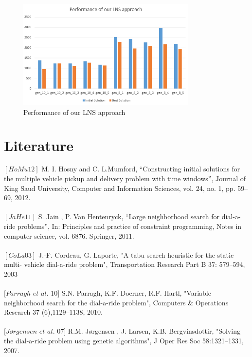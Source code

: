 \documentclass[fleqn]{scrartcl}
\begin{document}
\begin{figure}[H] 
\centering
\includegraphics[width=0.8\textwidth]{files/performance_lns.png}
\caption{Performance of our LNS approach}
\label{fig:performance}
\end{figure}

\newpage
\section{Literature}
$[HoMu 12]$ M. I. Hosny and C. L.Mumford, “Constructing initial solutions for the multiple vehicle pickup and delivery problem with time windows”, Journal of King Saud University, Computer and Information Sciences, vol. 24, no. 1, pp. 59–69, 2012.
\\
\\
$[JaHe 11]$ S. Jain , P. Van Hentenryck, “Large neighborhood search for dial-a-ride problems”, In: Principles and practice of constraint programming, Notes in computer science, vol. 6876. Springer, 2011.
\\
\\
$[CoLa 03]$ J.-F. Cordeau, G. Laporte, "A tabu search heuristic for the static multi- vehicle dial-a-ride problem", Transportation Research Part B 37: 579–594, 2003
\\
\\
$[Parragh$  $et$  $al.$ $10]$ S.N. Parragh, K.F. Doerner, R.F. Hartl, "Variable neighborhood search for the dial-a-ride problem", Computers \& Operations Research 37 (6),1129–1138, 2010. 
\\
\\
$[Jørgensen$ $et$ $al.$ $07]$ R.M. Jørgensen , J. Larsen, K.B. Bergvinsdottir, "Solving the dial-a-ride problem using genetic algorithms", J Oper Res Soc 58:1321–1331, 2007.
\end{document}
